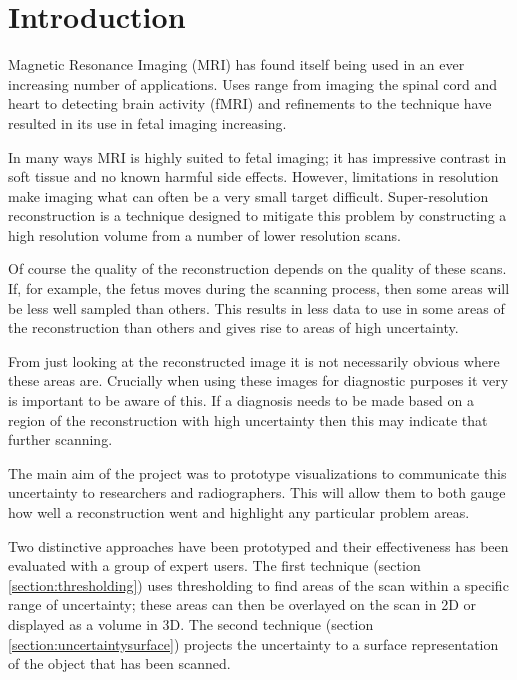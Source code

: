 \chapter{Introduction}\label{chapter:introduction}


Magnetic Resonance Imaging (MRI) has found itself being used in an ever increasing number of applications. Uses range from imaging the spinal cord and heart to detecting brain activity (fMRI) and refinements to the technique have resulted in its use in fetal imaging increasing.

In many ways MRI is highly suited to fetal imaging; it has impressive contrast in soft tissue and no known harmful side effects. However, limitations in resolution make imaging what can often be a very small target difficult. Super-resolution reconstruction is a technique designed to mitigate this problem by constructing a high resolution volume from a number of lower resolution scans.

Of course the quality of the reconstruction depends on the quality of these scans. If, for example, the fetus moves during the scanning process, then some areas will be less well sampled than others. This results in less data to use in some areas of the reconstruction than others and gives rise to areas of high uncertainty.
 
From just looking at the reconstructed image it is not necessarily obvious where these areas are. Crucially when using these images for diagnostic purposes it very is important to be aware of this. If a diagnosis needs to be made based on a region of the reconstruction with high uncertainty then this may indicate that further scanning.


The main aim of the project was to prototype visualizations to communicate this uncertainty to researchers and radiographers. This will allow them to both gauge how well a reconstruction went and highlight any particular problem areas.

Two distinctive approaches have been prototyped and their effectiveness has been evaluated with a group of expert users. The first technique (section \ref{section:thresholding}) uses thresholding to find areas of the scan within a specific range of uncertainty; these areas can then be overlayed on the scan in 2D or displayed as a volume in 3D. The second technique (section \ref{section:uncertaintysurface}) projects the uncertainty to a surface representation of the object that has been scanned.

